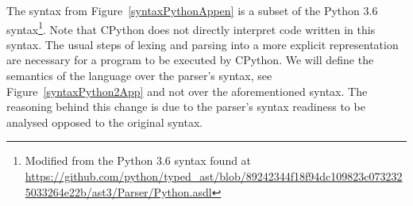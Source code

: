 %
%
%
%
%
%
%
%

The syntax from Figure~\ref{syntaxPythonAppen} is a subset of the Python 3.6 syntax\footnote{%
  Modified from the Python 3.6 syntax found at
  \url{https://github.com/python/typed_ast/blob/89242344f18f94dc109823c0732325033264e22b/ast3/Parser/Python.asdl}
}. Note that CPython does not directly interpret code written in this syntax. The usual
steps of lexing and parsing into a more explicit representation are necessary for a
program to be executed by CPython. We will define the semantics of the language over the
parser's syntax, see Figure~\ref{syntaxPython2App} and not over the aforementioned syntax. The reasoning behind this change
is due to the parser's syntax readiness to be analysed opposed to the original syntax.

